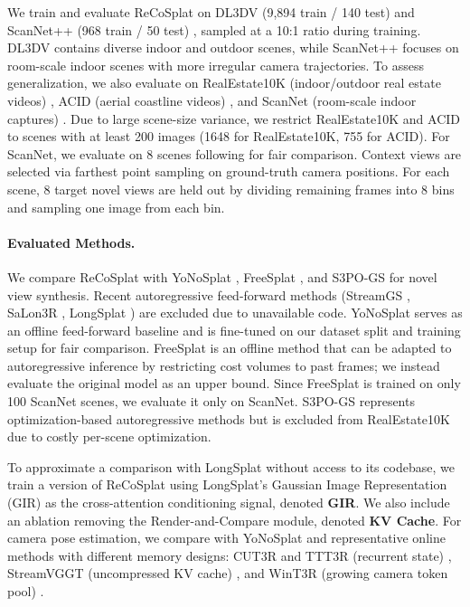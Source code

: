 \documentclass[runningheads]{llncs}
\begin{document}
We train and evaluate ReCoSplat on DL3DV \cite{ling2024dl3dv} (9,894 train / 140 test) and ScanNet++ (968 train / 50 test) \cite{yeshwanthliu2023scannetpp}, sampled at a 10:1 ratio during training. 
DL3DV contains diverse indoor and outdoor scenes, while ScanNet++ focuses on room-scale indoor scenes with more irregular camera trajectories.
%
To assess generalization, we also evaluate on RealEstate10K (indoor/outdoor real estate videos) \cite{re10k}, ACID (aerial coastline videos) \cite{acid}, and ScanNet (room-scale indoor captures) \cite{dai2017scannet}. 
Due to large scene-size variance, we restrict RealEstate10K and ACID to scenes with at least 200 images (1648 for RealEstate10K, 755 for ACID). 
For ScanNet, we evaluate on 8 scenes following \cite{FreeSplat} for fair comparison.
%
Context views are selected via farthest point sampling on ground-truth camera positions. 
For each scene, 8 target novel views are held out by dividing remaining frames into 8 bins and sampling one image from each bin.

\vspace{-2mm} \paragraph{\textbf{Evaluated Methods.}}

We compare ReCoSplat with YoNoSplat \cite{ye2025yonosplatneedmodelfeedforward}, FreeSplat \cite{FreeSplat}, and S3PO-GS \cite{S3PO-GS} for novel view synthesis. 
Recent autoregressive feed-forward methods (StreamGS \cite{StreamGS}, SaLon3R \cite{SaLon3R}, LongSplat \cite{huang2025longsplatonlinegeneralizable3d}) are excluded due to unavailable code. 
YoNoSplat serves as an offline feed-forward baseline and is fine-tuned on our dataset split and training setup for fair comparison. 
FreeSplat is an offline method that can be adapted to autoregressive inference by restricting cost volumes to past frames; we instead evaluate the original model as an upper bound. 
Since FreeSplat is trained on only 100 ScanNet scenes, we evaluate it only on ScanNet. 
S3PO-GS represents optimization-based autoregressive methods but is excluded from RealEstate10K due to costly per-scene optimization. 

To approximate a comparison with LongSplat without access to its codebase, we train a version of ReCoSplat using LongSplat's Gaussian Image Representation (GIR) as the cross-attention conditioning signal, denoted \textbf{GIR}.
We also include an ablation removing the Render-and-Compare module, denoted \textbf{KV Cache}. 
For camera pose estimation, we compare with YoNoSplat and representative online methods with different memory designs: CUT3R and TTT3R (recurrent state) \cite{cut3r, chen2025ttt3r}, StreamVGGT (uncompressed KV cache) \cite{streamVGGT}, and WinT3R (growing camera token pool) \cite{li2025wint3rwindowbasedstreamingreconstruction}.
\end{document}
